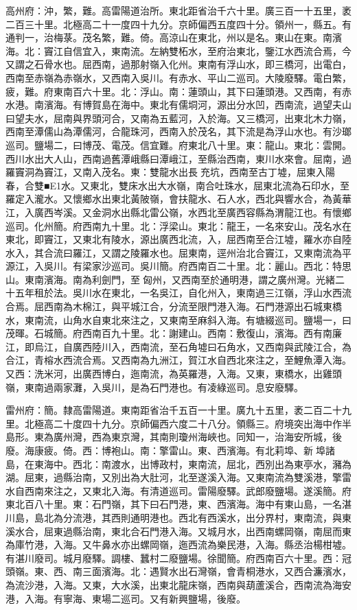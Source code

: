 \begin{pinyinscope}
高州府：沖，繁，難。高雷陽道治所。東北距省治千六十里。廣三百一十五里，袤二百三十里。北極高二十一度四十九分。京師偏西五度四十分。領州一，縣五。有通判一，治梅菉。茂名繁，難。倚。高涼山在東北，州以是名。東山在東。南濱海。北：竇江自信宜入，東南流。左納雙柘水，至府治東北，鑒江水西流合焉，今又謂之石骨水也。屈西南，過那射嶺入化州。東南有浮山水，即三橋河，出電白，西南至赤嶺為赤嶺水，又西南入吳川。有赤水、平山二巡司。大陵廢驛。電白繁，疲，難。府東南百六十里。北：浮山。南：蓮頭山，其下曰蓮頭港。又西南，有赤水港。南濱海。有博賀島在海中。東北有儒垌河，源出分水凹，西南流，過望夫山曰望夫水，屈南與界頭河合，又南為五藍河，入於海。又三橋河，出東北木力嶺，西南至潭儒山為潭儒河，合龍珠河，西南入於茂名，其下流是為浮山水也。有沙瑯巡司。鹽場二，曰博茂、電茂。信宜難。府東北八十里。東：龍山。東北：雲開。西川水出大人山，西南過舊潭峨縣曰潭峨江，至縣治西南，東川水來會。屈南，過羅竇洞為竇江，又南入茂名。東：雙龍水出長充坑，西南至古丁墟，屈東入陽春，合雙■E1水。又東北，雙床水出大水嶺，南合吐珠水，屈東北流為石印水，至羅定入瀧水。又懷鄉水出東北黃陂嶺，會扶龍水、石人水，西北與響水合，為黃華江，入廣西岑溪。又金洞水出縣北雷公嶺，水西北至廣西容縣為渭龍江也。有懷鄉巡司。化州簡。府西南九十里。北：浮梁山。東北：龍王，一名來安山。茂名水在東北，即竇江，又東北有陵水，源出廣西北流，入，屈西南至合江墟，羅水亦自陸水入，其合流曰羅江，又謂之陵羅水也。屈東南，逕州治北合竇江，又東南流為平源江，入吳川。有梁家沙巡司。吳川簡。府西南百二十里。北：麗山。西北：特思山。東南濱海。南為利劍門，至匈州，又西南至於通明港，謂之廣州灣。光緒二十五年租於法。吳川水在東北，一名吳江，自化州入，東南過三江嶺，浮山水西流合焉。屈西南為木棉江，與平城江合，分流至限門港入海。石門港源出石城東橋水，東南流，山角水自東北來注之，又東南至麻斜入海。有塘綴巡司。鹽場一，曰茂暉。石城簡。府西南百九十里。北：謝建山。西南：敷復山，濱海。西有南廉江，即烏江，自廣西陸川入，西南流，至石角墟曰石角水，又西南與武陵江合，為合江，青榕水西流合焉。又西南為九洲江，賀江水自西北來注之，至鯉魚潭入海。又西：洗米河，出廣西博白，迤南流，為英羅港，入海。又東，東橋水，出雞頭嶺，東南過兩家灘，入吳川，是為石門港也。有凌綠巡司。息安廢驛。

雷州府：簡。隸高雷陽道。東南距省治千五百一十里。廣九十五里，袤二百二十九里。北極高二十度四十九分。京師偏西六度二十八分。領縣三。府境突出海中作半島形。東為廣州灣，西為東京灣，其南則瓊州海峽也。同知一，治海安所城，後廢。海康疲。倚。西：博袍山。南：擎雷山。東、西濱海。有北莉埠、新𦫼埠諸島，在東海中。西北：南渡水，出博政村，東南流，屈北，西別出為東亭水，瀦為湖。屈東，過縣治南，又別出為大肚河，北至遂溪入海。又東南流為雙溪港，擎雷水自西南來注之，又東北入海。有清道巡司。雷陽廢驛。武郎廢鹽場。遂溪簡。府東北百八十里。東：石門嶺，其下曰石門港，東、西濱海。海中有東山島，一名湛川島，島北為分流港，其西則通明港也。西北有西溪水，出分界村，東南流，與東溪水合，屈東過縣治南，東北合石門港入海。又城月水，出西南螺岡嶺，南屈而東為庫竹港，入海。又牛鼻水亦出螺岡嶺，迤西流為樂民港，入海。縣丞治楊柑墟。有湛川廢司。城月廢驛。調樓、蠶村二廢鹽場。徐聞簡。府西南百六十里。西：冠頭嶺。東、西、南三面濱海。北：遇賢水出石灣嶺，會青桐港水，又西合濂濱水，為流沙港，入海。又東，大水溪，出東北龍床嶺，西南與葫蘆溪合，西南流為海安港，入海。有寧海、東場二巡司。又有新興鹽場，後廢。


\end{pinyinscope}
